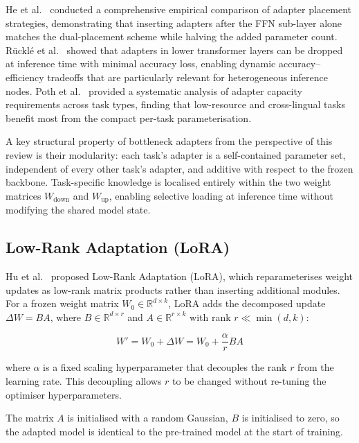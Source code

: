 He et al.~\cite{HeEffectiveness2021} conducted a comprehensive empirical comparison of adapter
placement strategies, demonstrating that inserting adapters after the FFN sub-layer
alone matches the dual-placement scheme while halving the added parameter count.
R{\"u}ckl{\'e} et al.~\cite{RuckleAdapterDrop2021} showed that adapters in lower transformer layers can be
dropped at inference time with minimal accuracy loss, enabling dynamic accuracy--efficiency
tradeoffs that are particularly relevant for heterogeneous inference nodes.
Poth et al.~\cite{PothAdapters2023} provided a systematic analysis of adapter capacity requirements
across task types, finding that low-resource and cross-lingual tasks benefit most from
the compact per-task parameterisation.

A key structural property of bottleneck adapters from the perspective of this review is
their modularity: each task's adapter is a self-contained parameter set, independent of
every other task's adapter, and additive with respect to the frozen backbone.
Task-specific knowledge is localised entirely within the two weight matrices
$W_\mathrm{down}$ and $W_\mathrm{up}$, enabling selective loading at inference time
without modifying the shared model state.

\subsection{Low-Rank Adaptation (LoRA)}
\label{sec:peft:lora}

Hu et al.~\cite{Hu2022} proposed Low-Rank Adaptation (LoRA), which reparameterises weight updates
as low-rank matrix products rather than inserting additional modules. For a frozen
weight matrix $W_0 \in \mathbb{R}^{d \times k}$, LoRA adds the decomposed update
$\Delta W = BA$, where $B \in \mathbb{R}^{d \times r}$ and $A \in \mathbb{R}^{r \times k}$
with rank $r \ll \min(d, k)$:

\begin{equation}
W' = W_0 + \Delta W = W_0 + \frac{\alpha}{r} BA
\label{eq:lora_intro}
\end{equation}

where $\alpha$ is a fixed scaling hyperparameter that decouples the rank $r$ from the learning rate. This decoupling allows $r$ to be changed without re-tuning the optimiser hyperparameters.

The matrix $A$ is initialised with a random Gaussian, $B$ is initialised to zero, so
the adapted model is identical to the pre-trained model at the start of training. 

